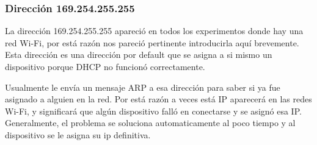 \subsubsection{Dirección 169.254.255.255}

La dirección 169.254.255.255 apareció en todos los experimentos donde hay una red Wi-Fi, por está razón nos pareció pertinente introducirla aquí brevemente. Esta dirección es una dirección por default que se asigna a si mismo un dispositivo porque DHCP no funcionó correctamente.

Usualmente le envía un mensaje ARP a esa dirección para saber si ya fue asignado a alguien en la red. Por está razón a veces está IP aparecerá en las redes Wi-Fi, y significará que algún dispositivo falló en conectarse y se asignó esa IP. Generalmente, el problema se soluciona automaticamente al poco tiempo y al dispositivo se le asigna su ip definitiva.



